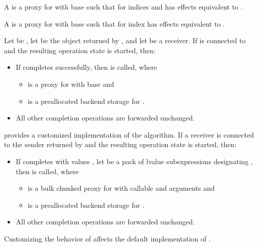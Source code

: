 \pnum
A 
is a proxy  for 
with base 
such that
 for indices  and 
has effects equivalent to .

\pnum
A 
is a proxy  for 
with base 
such that
 for index 
has effects equivalent to .

\pnum
Let  be ,
let  be the object returned by , and
let  be a receiver.
If  is connected to  and
the resulting operation state is started, then:
\begin{itemize}
\item
If  completes successfully,
then  is called, where
\begin{itemize}
\item
{} is a proxy for 
with base  and
\item
{} is a preallocated backend storage for .
\end{itemize}
\item
All other completion operations are forwarded unchanged.
\end{itemize}

\pnum
{} provides a customized implementation of
the  algorithm.
If a receiver  is connected to the sender
returned by  and
the resulting operation state is started, then:
\begin{itemize}
\item
If  completes with values ,
let  be a pack of lvalue subexpressions designating ,
then  is called, where
\begin{itemize}
\item
{} is a bulk chunked proxy for 
with callable  and arguments  and
\item
{} is a preallocated backend storage for .
\end{itemize}
\item
All other completion operations are forwarded unchanged.
\end{itemize}
\begin{note}
Customizing the behavior of 
affects the default implementation of .
\end{note}

